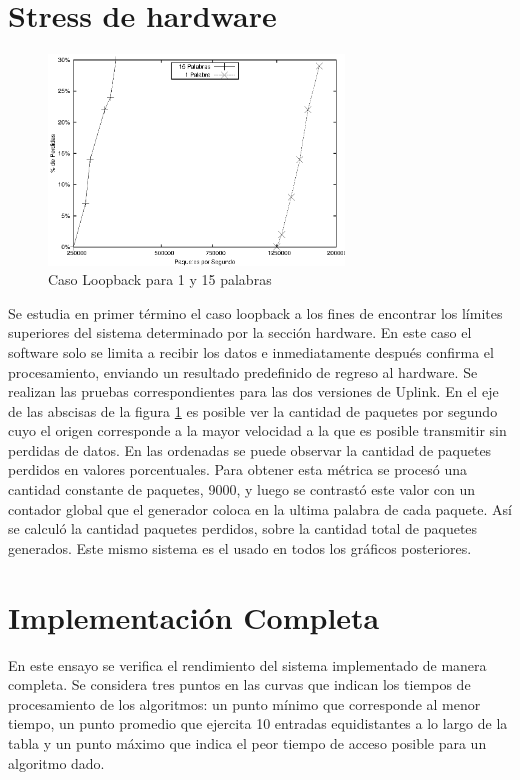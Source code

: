 \section{Stress de hardware}
\begin{figure}[h]
  \centering
	\includegraphics[width=0.70\textwidth]{5-resultados/graf/loop.eps}
  \caption{Caso Loopback para 1 y 15 palabras}
  \label{fig:loop}
\end{figure}
Se estudia en primer término el caso loopback a los fines de encontrar los límites superiores del sistema determinado por la sección hardware. En este caso el software solo se limita a recibir los datos e inmediatamente después confirma el procesamiento, enviando un resultado predefinido de regreso al hardware. Se realizan las pruebas correspondientes para las dos versiones de Uplink.
En el eje de las abscisas de la figura \ref{fig:loop} es posible ver la cantidad de paquetes por segundo cuyo el origen corresponde a la mayor velocidad a la que es posible transmitir sin perdidas de datos. En las ordenadas se puede observar la cantidad de paquetes perdidos en valores porcentuales. Para obtener esta métrica se procesó una cantidad constante de paquetes, 9000, y luego se contrastó este valor con un contador global que el generador coloca en la ultima palabra de cada paquete. Así se calculó la cantidad paquetes perdidos, sobre la cantidad total de paquetes generados. Este mismo sistema es el usado en todos los gráficos posteriores.


\newpage
\section{Implementación Completa}

En este ensayo se verifica el rendimiento del sistema implementado de manera completa. Se considera tres puntos en las curvas que indican los tiempos de procesamiento de los algoritmos: un punto mínimo que corresponde al menor tiempo, un punto promedio que ejercita 10 entradas equidistantes a lo largo de la tabla y un punto máximo que indica el peor tiempo de acceso posible para un algoritmo dado. 

